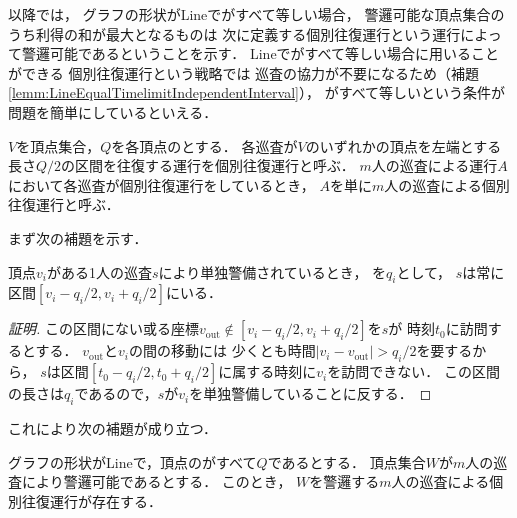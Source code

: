 以降では，
グラフの形状がLineで{\timelimit}がすべて等しい場合，
警邏可能な頂点集合のうち利得の和が最大となるものは
次に定義する個別往復運行という運行によって警邏可能であるということを示す．
Lineで{\timelimit}がすべて等しい場合に用いることができる
個別往復運行という戦略では
巡査の協力が不要になるため（補題\ref{lemm:LineEqualTimelimitIndependentInterval}），
{\timelimit}がすべて等しいという条件が問題を簡単にしているといえる．


\begin{defi}
    $V$を頂点集合，$Q$を各頂点の{\timelimit}とする．
    各巡査が$V$のいずれかの頂点を左端とする長さ$Q/2$の区間を往復する運行を個別往復運行と呼ぶ．
    $m$人の巡査による運行$A$において各巡査が個別往復運行をしているとき，
    $A$を単に$m$人の巡査による個別往復運行と呼ぶ．
\end{defi}



まず次の補題を示す．

\begin{lemm}
    \label{lemm:RangeOfPatrollerOnLine}
    頂点$v_i$がある1人の巡査$s$により単独警備されているとき，
    {\timelimit}を$q_i$として，
    $s$は常に区間$[v_i - q_i/2, v_i + q_i/2]$にいる．
\end{lemm}

\begin{proof}[証明]
    \newcommand{\vout}{v_{\mathrm{out}}}
    この区間にない或る座標$\vout \notin [v_i - q_i/2, v_i + q_i/2]$を$s$が
    時刻$t_0$に訪問するとする．
    $\vout$と$v_i$の間の移動には
    少くとも時間$\lvert v_i - \vout \rvert > q _i / 2$を要するから，
    $s$は区間$[t_0 - q _i / 2, t_0 + q _i / 2]$に属する時刻に$v_i$を訪問できない．
    この区間の長さは$
        q_i
    $であるので，$s$が$v _i$を単独警備していることに反する．
\end{proof}



これにより次の補題が成り立つ．


\begin{lemm}
 \label{lemm:LineEqualTimelimitIndependentInterval}
    グラフの形状がLineで，頂点の{\timelimit}がすべて$Q$であるとする．
    頂点集合$W$が$m$人の巡査により警邏可能であるとする．
    このとき，
    $W$を警邏する$m$人の巡査による個別往復運行が存在する．
\end{lemm}


